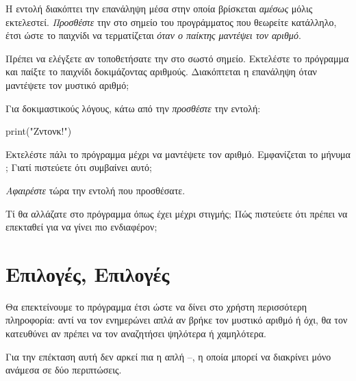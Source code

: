 \documentclass[a4paper,11pt,oneside]{book}
\begin{document}
\begin{step}
Η εντολή  διακόπτει την επανάληψη μέσα στην οποία βρίσκεται \emph{αμέσως} μόλις εκτελεστεί.
\emph{Προσθέστε} την  στο σημείο του προγράμματος που θεωρείτε κατάλληλο, έτσι ώστε το παιχνίδι να τερματίζεται \emph{όταν ο παίκτης μαντέψει τον αριθμό}.

Πρέπει να ελέγξετε αν τοποθετήσατε την  στο σωστό σημείο. Εκτελέστε το πρόγραμμα και παίξτε το παιχνίδι δοκιμάζοντας αριθμούς. Διακόπτεται η επανάληψη όταν μαντέψετε τον μυστικό αριθμό;

\marginnote[14pt]{\icondiscuss}
\dottedline
\end{step}

\begin{step}
Για δοκιμαστικούς λόγους, κάτω από την  \emph{προσθέστε} την εντολή:

\begin{pynew}
print("Ζντονκ!")
\end{pynew}

Εκτελέστε πάλι το πρόγραμμα μέχρι να μαντέψετε τον αριθμό. Εμφανίζεται το μήνυμα ; Γιατί πιστεύετε ότι συμβαίνει αυτό;

\marginnote[14pt]{\icondiscuss}
\dottedline

\dottedline

\emph{Αφαιρέστε} τώρα την εντολή που προσθέσατε.
\end{step}

\begin{step}
Τί θα αλλάζατε στο πρόγραμμα όπως έχει μέχρι στιγμής; Πώς πιστεύετε ότι πρέπει να επεκταθεί για να γίνει πιο ενδιαφέρον;

\marginnote[14pt]{\icondiscuss}
\dottedline

\end{step}

\section{Επιλογές, Επιλογές}

Θα επεκτείνουμε το πρόγραμμα έτσι ώστε να δίνει στο χρήστη περισσότερη πληροφορία: αντί να τον ενημερώνει απλά αν βρήκε τον μυστικό αριθμό ή όχι, θα τον κατευθύνει αν πρέπει να τον αναζητήσει ψηλότερα ή χαμηλότερα.

Για την επέκταση αυτή δεν αρκεί πια η απλή --, η οποία μπορεί να διακρίνει μόνο ανάμεσα σε δύο περιπτώσεις. 
\end{document}
